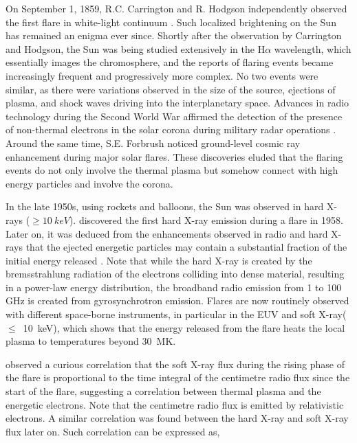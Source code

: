 On September 1, 1859, R.C. Carrington and R. Hodgson independently observed the first flare in white-light continuum \citep{carrington1859, hodgson1859}. Such localized brightening on the Sun has remained an enigma ever since. Shortly after the observation by Carrington and Hodgson, the Sun was being studied extensively in the H$\alpha$ wavelength, which essentially images the chromosphere, and the reports of flaring events became increasingly frequent and progressively more complex. No two events were similar, as there were variations observed in the size of the source, ejections of plasma, and shock waves driving into the interplanetary space. Advances in radio technology during the Second World War affirmed the detection of the presence of non-thermal electrons in the solar corona during military radar operations \citep{hey46}. Around the same time, S.E. Forbrush noticed ground-level cosmic ray enhancement during major solar flares. These discoveries eluded that the flaring events do not only involve the thermal plasma but somehow connect with high energy particles and involve the corona. 

In the late 1950s, using rockets and balloons, the Sun was observed in hard X-rays ($\ge10~keV$). \cite{peterson59} discovered the first hard X-ray emission during a flare in 1958. Later on, it was deduced from the enhancements observed in radio and hard X-rays that the ejected energetic particles may contain a substantial fraction of the initial energy released \citep{brown71}. Note that while the hard X-ray is created by the bremsstrahlung radiation of the electrons colliding into dense material, resulting in a power-law energy distribution, the broadband radio emission from 1 to 100 GHz is created from gyrosynchrotron emission. Flares are now routinely observed with different space-borne instruments, in particular in the EUV and soft X-ray($\le$~10~keV), which shows that the energy released from the flare heats the local plasma to temperatures beyond 30~MK.


\cite{neupert68} observed a curious correlation that the soft X-ray flux during the rising phase of the flare is proportional to the time integral of the centimetre radio flux since the start of the flare, suggesting a correlation between thermal plasma and the energetic electrons. Note that the centimetre radio flux is emitted by relativistic electrons. A similar correlation was found between the hard X-ray and soft X-ray flux later on. Such correlation can be expressed as,

